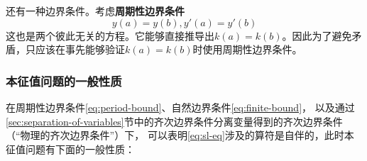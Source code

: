 \documentclass[UTF8]{ctexart}
\begin{document}
还有一种边界条件。考虑\textbf{周期性边界条件}
\begin{equation}
    y(a)=y(b), y'(a) = y'(b)
    \label{eq:period-bound}
\end{equation}
这也是两个彼此无关的方程。它能够直接推导出$k(a)=k(b)$。因此为了避免矛盾，只应该在事先能够验证$k(a)=k(b)$时使用周期性边界条件。

\subsubsection{本征值问题的一般性质} 

在周期性边界条件\eqref{eq:period-bound}、自然边界条件\eqref{eq:finite-bound}，
以及通过\ref{sec:separation-of-variables}节中的齐次边界条件分离变量得到的齐次边界条件（“物理的齐次边界条件”）下，
可以表明\eqref{eq:sl-eq}涉及的算符是自伴的，此时本征值问题有下面的一般性质：
\end{document}
